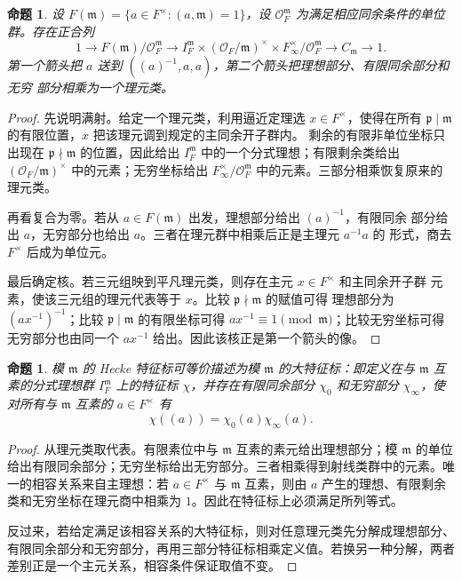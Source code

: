 \documentclass[11pt,a4paper,openany]{ctexbook}
\numberwithin{equation}{chapter}
\theoremstyle{plain}
\newtheorem{proposition}[theorem]{命题}
\theoremstyle{definition}
\theoremstyle{remark}
\begin{document}
\begin{proposition}
设 $F(\mathfrak m)=\{a\in F^\times:(a,\mathfrak m)=1\}$，设 $\mathcal O_F^{\mathfrak m}$
为满足相应同余条件的单位群。存在正合列
\[
  1\longrightarrow F(\mathfrak m)/\mathcal O_F^{\mathfrak m}
  \longrightarrow
  I_F^{\mathfrak m}\times(\mathcal O_F/\mathfrak m)^\times
  \times F_\infty^\times/\mathcal O_F^{\mathfrak m}
  \longrightarrow C_{\mathfrak m}\longrightarrow 1.
\]
第一个箭头把 $a$ 送到 $((a)^{-1},a,a)$，第二个箭头把理想部分、有限同余部分和无穷
部分相乘为一个理元类。
\end{proposition}

\begin{proof}
先说明满射。给定一个理元类，利用逼近定理选 $x\in F^\times$，使得在所有
$\mathfrak p\mid\mathfrak m$ 的有限位置，$x$ 把该理元调到规定的主同余开子群内。
剩余的有限非单位坐标只出现在 $\mathfrak p\nmid\mathfrak m$ 的位置，因此给出
$I_F^{\mathfrak m}$ 中的一个分式理想；有限剩余类给出
$(\mathcal O_F/\mathfrak m)^\times$ 中的元素；无穷坐标给出
$F_\infty^\times/\mathcal O_F^{\mathfrak m}$ 中的元素。三部分相乘恢复原来的理元类。

再看复合为零。若从 $a\in F(\mathfrak m)$ 出发，理想部分给出 $(a)^{-1}$，有限同余
部分给出 $a$，无穷部分也给出 $a$。三者在理元群中相乘后正是主理元 $a^{-1}a$ 的
形式，商去 $F^\times$ 后成为单位元。

最后确定核。若三元组映到平凡理元类，则存在主元 $x\in F^\times$ 和主同余开子群
元素，使该三元组的理元代表等于 $x$。比较 $\mathfrak p\nmid\mathfrak m$ 的赋值可得
理想部分为 $(ax^{-1})^{-1}$；比较 $\mathfrak p\mid\mathfrak m$ 的有限坐标可得
$ax^{-1}\equiv1\pmod{\mathfrak m}$；比较无穷坐标可得无穷部分也由同一个
$ax^{-1}$ 给出。因此该核正是第一个箭头的像。
\end{proof}

\begin{proposition}
模 $\mathfrak m$ 的 Hecke 特征标可等价描述为模 $\mathfrak m$ 的大特征标：即定义在与 $\mathfrak m$ 互素的分式理想群 $I_F^{\mathfrak m}$ 上的特征标 $\chi$，并存在有限同余部分 $\chi_0$ 和无穷部分 $\chi_\infty$，使对所有与 $\mathfrak m$ 互素的 $a\in F^\times$ 有
\[
  \chi((a))=\chi_0(a)\chi_\infty(a).
\]
\end{proposition}

\begin{proof}
从理元类取代表。有限素位中与 $\mathfrak m$ 互素的素元给出理想部分；模 $\mathfrak m$ 的单位给出有限同余部分；无穷坐标给出无穷部分。三者相乘得到射线类群中的元素。唯一的相容关系来自主理想：若 $a\in F^\times$ 与 $\mathfrak m$ 互素，则由 $a$ 产生的理想、有限剩余类和无穷坐标在理元商中相乘为 $1$。因此在特征标上必须满足所列等式。

反过来，若给定满足该相容关系的大特征标，则对任意理元类先分解成理想部分、有限同余部分和无穷部分，再用三部分特征标相乘定义值。若换另一种分解，两者差别正是一个主元关系，相容条件保证取值不变。
\end{proof}
\end{document}
